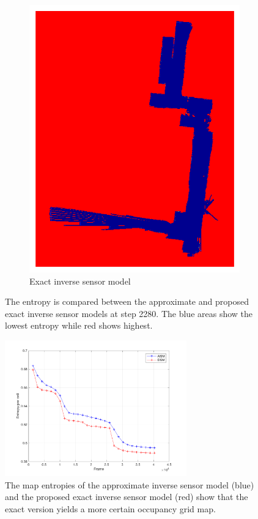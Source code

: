 \documentclass[smallextended]{svjour3}       %
\begin{document}
\begin{figure}[!ht]
\begin{subfigure}[t]{0.35\columnwidth}
        \includegraphics[width=\textwidth]{EISM_Image_inf_19.pdf}
        \caption{Exact inverse sensor model}
        \label{fig:EISM}
    \end{subfigure}
    \caption{The entropy is compared between the approximate and proposed exact inverse sensor models at step 2280. The blue areas show the lowest entropy while red shows highest.}
    \label{fig:entropy_comp}
\end{figure}


\begin{figure}
  \centering
  \includegraphics[width=0.7\textwidth]{entropy_frame.png}
  \caption{The map entropies of the approximate inverse sensor model (blue) and the proposed exact inverse sensor model (red) show that the exact version yields a more certain occupancy grid map.}
  \label{fig:entropy}
\end{figure}
\end{document}
